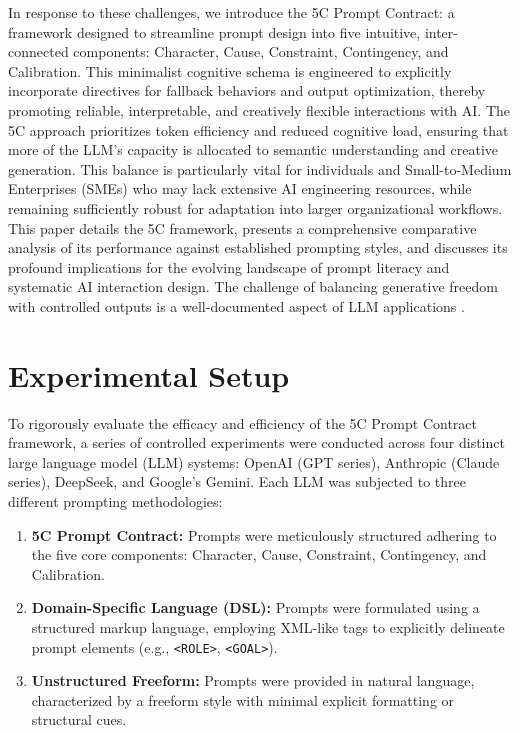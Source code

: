 \documentclass[10pt, a4paper]{article}
\begin{document}
In response to these challenges, we introduce the 5C Prompt Contract: a framework designed to streamline prompt design into five intuitive, inter-connected components: Character, Cause, Constraint, Contingency, and Calibration. This minimalist cognitive schema is engineered to explicitly incorporate directives for fallback behaviors and output optimization, thereby promoting reliable, interpretable, and creatively flexible interactions with AI. The 5C approach prioritizes token efficiency and reduced cognitive load, ensuring that more of the LLM's capacity is allocated to semantic understanding and creative generation. This balance is particularly vital for individuals and Small-to-Medium Enterprises (SMEs) who may lack extensive AI engineering resources, while remaining sufficiently robust for adaptation into larger organizational workflows. This paper details the 5C framework, presents a comprehensive comparative analysis of its performance against established prompting styles, and discusses its profound implications for the evolving landscape of prompt literacy and systematic AI interaction design. The challenge of balancing generative freedom with controlled outputs is a well-documented aspect of LLM applications \cite{vaswani2017attention}.

\section{Experimental Setup}
To rigorously evaluate the efficacy and efficiency of the 5C Prompt Contract framework, a series of controlled experiments were conducted across four distinct large language model (LLM) systems: OpenAI (GPT series), Anthropic (Claude series), DeepSeek, and Google's Gemini. Each LLM was subjected to three different prompting methodologies:
\begin{enumerate}
    \item \textbf{5C Prompt Contract:} Prompts were meticulously structured adhering to the five core components: Character, Cause, Constraint, Contingency, and Calibration.
    \item \textbf{Domain-Specific Language (DSL):} Prompts were formulated using a structured markup language, employing XML-like tags to explicitly delineate prompt elements (e.g., \texttt{<ROLE>}, \texttt{<GOAL>}).
    \item \textbf{Unstructured Freeform:} Prompts were provided in natural language, characterized by a freeform style with minimal explicit formatting or structural cues.
\end{enumerate}
\end{document}
